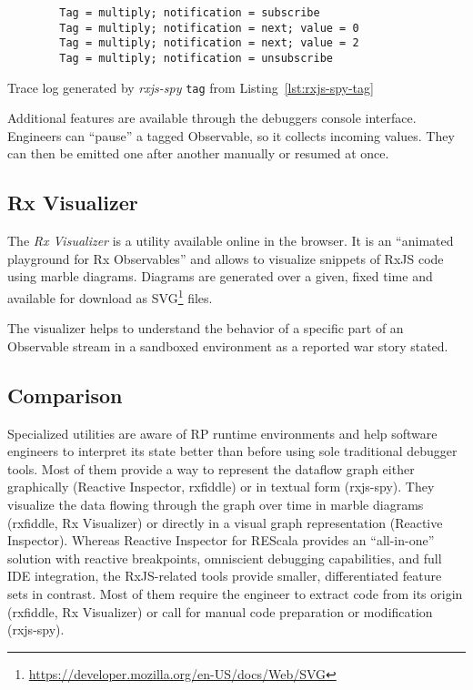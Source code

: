 \documentclass[12pt,a4paper]{article}
\begin{document}
\begin{listing}[H]
	\begin{verbatim}
		Tag = multiply; notification = subscribe
		Tag = multiply; notification = next; value = 0
		Tag = multiply; notification = next; value = 2
		Tag = multiply; notification = unsubscribe
	\end{verbatim}
	\caption{Trace log generated by \emph{rxjs-spy} \texttt{tag} from Listing~\ref{lst:rxjs-spy-tag}}
	\label{lst:rxjs-spy-log}
\end{listing}

Additional features are available through the debuggers console interface. Engineers can ``pause'' a tagged Observable, so it collects incoming values. They can then be emitted one after another manually or resumed at once.

\subsection{Rx Visualizer}

The \emph{Rx Visualizer}\cite{rxviz} is a utility available online in the browser. It is an ``animated playground for Rx Observables''\cite{rxviz} and allows to visualize snippets of RxJS code using marble diagrams. Diagrams are generated over a given, fixed time and available for download as SVG\footnote{\url{https://developer.mozilla.org/en-US/docs/Web/SVG}} files.

The visualizer helps to understand the behavior of a specific part of an Observable stream in a sandboxed environment as a reported war story stated.

\subsection{Comparison}

Specialized utilities are aware of RP runtime environments and help software engineers to interpret its state better than before using sole traditional debugger tools. Most of them provide a way to represent the dataflow graph either graphically (Reactive Inspector, rxfiddle) or in textual form (rxjs-spy). They visualize the data flowing through the graph over time in marble diagrams (rxfiddle, Rx Visualizer) or directly in a visual graph representation (Reactive Inspector). Whereas Reactive Inspector for REScala provides an ``all-in-one'' solution with reactive breakpoints, omniscient debugging capabilities, and full IDE integration, the RxJS-related tools provide smaller, differentiated feature sets in contrast. Most of them require the engineer to extract code from its origin (rxfiddle, Rx Visualizer) or call for manual code preparation or modification (rxjs-spy).
\end{document}
